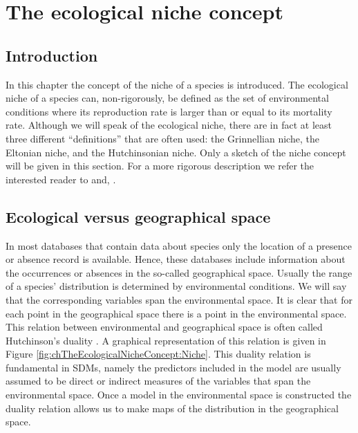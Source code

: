 \chapter{The ecological niche concept}
\label{ch:TheEcologicalNicheConcept}
\section{Introduction}
\label{sec:chTheEcologicalNicheConcept:Introduction}
In this chapter the concept of the niche of a species is introduced. The ecological niche of a species can, non-rigorously, be defined as the set of environmental conditions where its reproduction rate is larger than or equal to its mortality rate. Although we will speak of the ecological niche, there are in fact at least three different ``definitions'' that are often used: the Grinnellian niche, the Eltonian niche, and the Hutchinsonian niche. Only a sketch of the niche concept will be given in this section. For a more rigorous description we refer the interested reader to \cite{soberon_grinnellian_2007} and, \cite{soberon_niches_2009}.

\section{Ecological versus geographical space}
In most databases that contain data about species only the location of a presence or absence record is available. Hence, these databases include information about the occurrences or absences in the so-called geographical space. Usually the range of a species' distribution is determined by environmental conditions. We will say that the corresponding variables span the environmental space. It is clear that for each point in the geographical space there is a point in the environmental space. This relation between environmental and geographical space is often called Hutchinson's duality \parencite{colwell_hutchinsons_2009}. A graphical representation of this relation is given in Figure \ref{fig:chTheEcologicalNicheConcept:Niche}. This duality relation is fundamental in SDMs, namely the predictors included in the model are usually assumed to be direct or indirect measures of the variables that span the environmental space. Once a model in the environmental space is constructed the duality relation allows us to make maps of the distribution in the geographical space. \\


